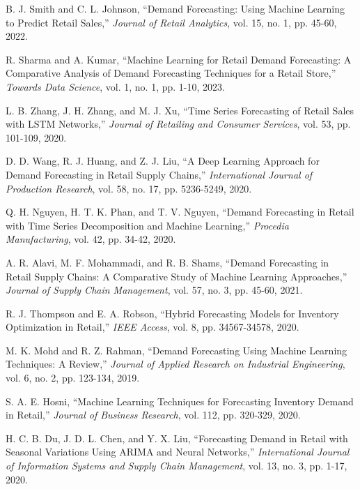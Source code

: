 \documentclass[10pt]{report}
\begin{document}
\begin{center}
\begin{thebibliography}{99}
    B. J. Smith and C. L. Johnson, “Demand Forecasting: Using Machine Learning to Predict Retail Sales,” \textit{Journal of Retail Analytics}, vol. 15, no. 1, pp. 45-60, 2022.

    R. Sharma and A. Kumar, “Machine Learning for Retail Demand Forecasting: A Comparative Analysis of Demand Forecasting Techniques for a Retail Store,” \textit{Towards Data Science}, vol. 1, no. 1, pp. 1-10, 2023.

    L. B. Zhang, J. H. Zhang, and M. J. Xu, “Time Series Forecasting of Retail Sales with LSTM Networks,” \textit{Journal of Retailing and Consumer Services}, vol. 53, pp. 101-109, 2020.

    D. D. Wang, R. J. Huang, and Z. J. Liu, “A Deep Learning Approach for Demand Forecasting in Retail Supply Chains,” \textit{International Journal of Production Research}, vol. 58, no. 17, pp. 5236-5249, 2020.

    Q. H. Nguyen, H. T. K. Phan, and T. V. Nguyen, “Demand Forecasting in Retail with Time Series Decomposition and Machine Learning,” \textit{Procedia Manufacturing}, vol. 42, pp. 34-42, 2020.

    A. R. Alavi, M. F. Mohammadi, and R. B. Shams, “Demand Forecasting in Retail Supply Chains: A Comparative Study of Machine Learning Approaches,” \textit{Journal of Supply Chain Management}, vol. 57, no. 3, pp. 45-60, 2021.

    R. J. Thompson and E. A. Robson, “Hybrid Forecasting Models for Inventory Optimization in Retail,” \textit{IEEE Access}, vol. 8, pp. 34567-34578, 2020.

    M. K. Mohd and R. Z. Rahman, “Demand Forecasting Using Machine Learning Techniques: A Review,” \textit{Journal of Applied Research on Industrial Engineering}, vol. 6, no. 2, pp. 123-134, 2019.

    S. A. E. Hosni, “Machine Learning Techniques for Forecasting Inventory Demand in Retail,” \textit{Journal of Business Research}, vol. 112, pp. 320-329, 2020.

    H. C. B. Du, J. D. L. Chen, and Y. X. Liu, “Forecasting Demand in Retail with Seasonal Variations Using ARIMA and Neural Networks,” \textit{International Journal of Information Systems and Supply Chain Management}, vol. 13, no. 3, pp. 1-17, 2020.


\end{thebibliography}
\end{center}
\end{document}
